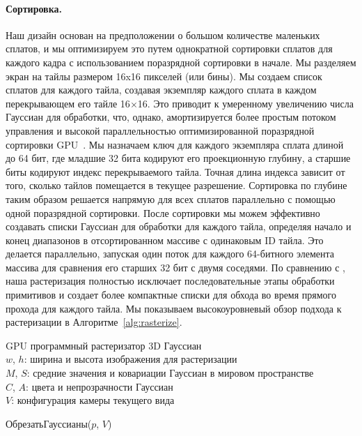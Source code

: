\begin{appendix}
    \paragraph{Сортировка.}
    Наш дизайн основан на предположении о большом количестве маленьких сплатов, и мы оптимизируем это путем однократной сортировки сплатов для каждого кадра с использованием поразрядной сортировки в начале.
    Мы разделяем экран на тайлы размером 16x16 пикселей (или бины). Мы создаем список сплатов для каждого тайла, создавая экземпляр каждого сплата в каждом перекрывающем его тайле 16$\times$16. Это приводит к умеренному увеличению числа Гауссиан для обработки, 
    что, однако, амортизируется более простым потоком управления и высокой параллельностью оптимизированной поразрядной сортировки GPU~\cite{merrill2010revisiting}.
    Мы назначаем ключ для каждого экземпляра сплата длиной до 64 бит, где младшие 32 бита кодируют его проекционную глубину, а старшие биты кодируют индекс перекрываемого тайла. Точная длина индекса зависит от того, сколько тайлов помещается в текущее разрешение. Сортировка по глубине таким образом решается напрямую для всех сплатов параллельно с помощью одной поразрядной сортировки. После сортировки мы можем эффективно создавать списки Гауссиан для обработки для каждого тайла, определяя начало и конец диапазонов в отсортированном массиве с одинаковым ID тайла. Это делается параллельно, запуская один поток для каждого 64-битного элемента массива для сравнения его старших 32 бит с двумя соседями. 
    По сравнению с \cite{Lassner_2021_CVPR}, наша растеризация полностью исключает последовательные этапы обработки примитивов и создает более компактные списки для обхода во время прямого прохода для каждого тайла.
    Мы показываем высокоуровневый обзор подхода к растеризации в Алгоритме~\ref{alg:rasterize}.
    \begin{algorithm}
        \caption{GPU программный растеризатор 3D Гауссиан\\
            $w$, $h$: ширина и высота изображения для растеризации\\
            $M$, $S$: средние значения и ковариации Гауссиан в мировом пространстве\\
            $C$, $A$: цвета и непрозрачности Гауссиан\\
            $V$: конфигурация камеры текущего вида}
        \label{alg:rasterize}
        \begin{algorithmic}
            \State ОбрезатьГауссианы($p$, $V$) 

\end{algorithmic}
\end{algorithm}
\end{appendix}
